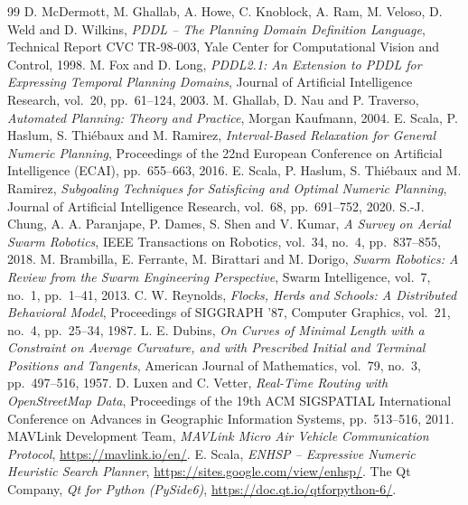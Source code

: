 \documentclass[11pt,a4paper,oneside]{report}
\begin{document}
\clearpage
{}
{}
\renewcommand{\bibname}{References}
\makeatletter\renewcommand\@biblabel[1]{}\makeatother
\begin{thebibliography}{99}
\setlength{\itemsep}{3pt}
 D. McDermott, M. Ghallab, A. Howe, C. Knoblock, A. Ram, M. Veloso,
  D. Weld and D. Wilkins, \emph{PDDL -- The Planning Domain Definition Language}, Technical Report
  CVC TR-98-003, Yale Center for Computational Vision and Control, 1998.
 M. Fox and D. Long, \emph{PDDL2.1: An Extension to PDDL for Expressing
  Temporal Planning Domains}, Journal of Artificial Intelligence Research, vol.~20, pp.~61--124,
  2003.
 M. Ghallab, D. Nau and P. Traverso, \emph{Automated Planning:
  Theory and Practice}, Morgan Kaufmann, 2004.
 E. Scala, P. Haslum, S. Thi\'ebaux and M. Ramirez,
  \emph{Interval-Based Relaxation for General Numeric Planning}, Proceedings of the 22nd European
  Conference on Artificial Intelligence (ECAI), pp.~655--663, 2016.
 E. Scala, P. Haslum, S. Thi\'ebaux and M. Ramirez,
  \emph{Subgoaling Techniques for Satisficing and Optimal Numeric Planning}, Journal of Artificial
  Intelligence Research, vol.~68, pp.~691--752, 2020.
 S.-J. Chung, A. A. Paranjape, P. Dames, S. Shen and V. Kumar,
  \emph{A Survey on Aerial Swarm Robotics}, IEEE Transactions on Robotics, vol.~34, no.~4,
  pp.~837--855, 2018.
 M. Brambilla, E. Ferrante, M. Birattari and M. Dorigo,
  \emph{Swarm Robotics: A Review from the Swarm Engineering Perspective}, Swarm Intelligence,
  vol.~7, no.~1, pp.~1--41, 2013.
 C. W. Reynolds, \emph{Flocks, Herds and Schools: A Distributed
  Behavioral Model}, Proceedings of SIGGRAPH '87, Computer Graphics, vol.~21, no.~4, pp.~25--34,
  1987.
 L. E. Dubins, \emph{On Curves of Minimal Length with a Constraint on
  Average Curvature, and with Prescribed Initial and Terminal Positions and Tangents}, American
  Journal of Mathematics, vol.~79, no.~3, pp.~497--516, 1957.
 D. Luxen and C. Vetter, \emph{Real-Time Routing with OpenStreetMap Data},
  Proceedings of the 19th ACM SIGSPATIAL International Conference on Advances in Geographic
  Information Systems, pp.~513--516, 2011.
 MAVLink Development Team, \emph{MAVLink Micro Air Vehicle Communication
  Protocol}, \url{https://mavlink.io/en/}.
 E. Scala, \emph{ENHSP -- Expressive Numeric Heuristic Search Planner},
  \url{https://sites.google.com/view/enhsp/}.
 The Qt Company, \emph{Qt for Python (PySide6)},
  \url{https://doc.qt.io/qtforpython-6/}.
\end{thebibliography}
\end{document}
